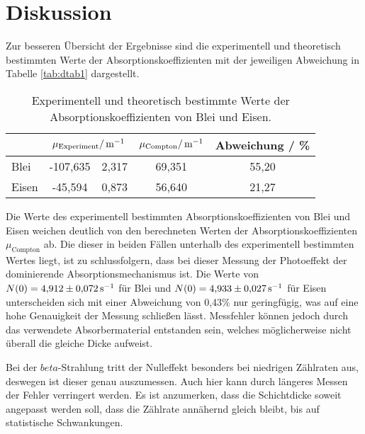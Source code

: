 \section{Diskussion}
\label{sec:Diskussion}

Zur besseren Übersicht der Ergebnisse sind die experimentell und theoretisch bestimmten Werte der Absorptionskoeffizienten
mit der jeweiligen Abweichung in Tabelle \ref{tab:dtab1} dargestellt.
\FloatBarrier
\begin{table}[h]
    \centering
    \caption{Experimentell und theoretisch bestimmte Werte der Absorptionskoeffizienten von Blei und Eisen.}
    \label{tab:atab2}
    \begin{tabular}{l S[table-format=3.3] @{${}\pm{}$} S[table-format=1.4] S[table-format=2.3] S[table-format=2.2]}
        \toprule
        {} &  & {$\mu_\text{Compton} / \, \si[per-mode=reciprocal]{\per\meter}$} & {Abweichung / \%} \\
        \midrule
        {Blei}  &  -107,635 & 2,317 & 69,351 & 55,20 \\
        {Eisen} &  -45,594  & 0,873 & 56,640 & 21,27 \\
        \bottomrule
    \end{tabular}
\end{table}
\FloatBarrier
\noindent
Die Werte des experimentell bestimmten Absorptionskoeffizienten von Blei und Eisen weichen deutlich von den berechneten
Werten der Absorptionskoeffizienten $\mu_\text{Compton}$ ab. Die dieser in beiden Fällen unterhalb des experimentell 
bestimmten Wertes liegt, ist zu schlussfolgern, dass bei dieser Messung der Photoeffekt der dominierende Absorptionsmechanismus ist. 
Die Werte von $N(0) = \num{4,912(72)} \, \si[per-mode=reciprocal]{\per\second}$ für Blei und $N(0) = \num{4,933(27)} \, \si[per-mode=reciprocal]{\per\second}$
für Eisen unterscheiden sich mit einer Abweichung von 0,43\% nur geringfügig, was auf eine hohe Genauigkeit der Messung schließen lässt.
Messfehler können jedoch durch das verwendete Absorbermaterial entstanden sein, welches möglicherweise nicht überall
die gleiche Dicke aufweist.

Bei der $beta$-Strahlung tritt der Nulleffekt besonders bei niedrigen Zählraten aus, 
deswegen ist dieser genau auszumessen. Auch hier kann durch längeres Messen der Fehler verringert werden. 
Es ist anzumerken, dass die Schichtdicke soweit angepasst werden soll, dass die Zählrate annähernd 
gleich bleibt, bis auf statistische Schwankungen. 